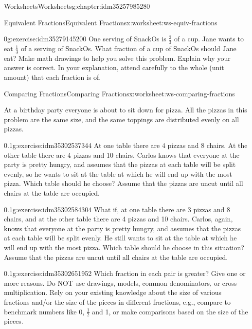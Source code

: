 \documentclass[twoside,11pt,]{book}
\begin{document}
\begin{chapterptx}{Worksheets}{}{Worksheets}{}{}{g:chapter:idm35257985280}
\begin{worksheet-section-numberless}{Equivalent Fractions}{}{Equivalent Fractions}{}{}{x:worksheet:ws-equiv-fractions}
\begin{divisionexercise}{5}{}{0}{g:exercise:idm35279145200}%
One serving of SnackOs is \(\frac{2}{3} \) of a cup. Jane wants to eat \(\frac{1}{3} \) of a serving of SnackOs. What fraction of a cup of SnackOs should Jane eat? Make math drawings to help you solve this problem. Explain why your answer is correct. In your explanation, attend carefully to the whole (unit amount) that each fraction is of.%
\end{divisionexercise}%
\end{worksheet-section-numberless}
\restoregeometry
%
%
\typeout{************************************************}
\typeout{************************************************}
%
\begin{worksheet-section-numberless}{Comparing Fractions}{}{Comparing Fractions}{}{}{x:worksheet:ws-comparing-fractions}
\begin{introduction}{}%
At a birthday party everyone is about to sit down for pizza.  All the pizzas in this problem are the same size, and the same toppings are distributed evenly on all pizzas.%
\end{introduction}%
\begin{divisionexercise}{1}{}{0.1}{g:exercise:idm35302537344}%
At one table there are 4 pizzas and 8 chairs.  At the other table there are 4 pizzas and 10 chairs.  Carlos knows that everyone at the party is pretty hungry, and assumes that the pizzas at each table will be split evenly, so he wants to sit at the table at which he will end up with the most pizza.  Which table should he choose?  Assume that the pizzas are uncut until all chairs at the table are occupied.%
\end{divisionexercise}%
\begin{divisionexercise}{2}{}{0.1}{g:exercise:idm35302584304}%
What if, at one table there are 3 pizzas and 8 chairs, and at the other table there are 4 pizzas and 10 chairs.  Carlos, again, knows that everyone at the party is pretty hungry, and assumes that the pizzas at each table will be split evenly.  He still wants to sit at the table at which he will end up with the most pizza.  Which table should he choose in this situation? Assume that the pizzas are uncut until all chairs at the table are occupied.%
\end{divisionexercise}%
\begin{divisionexercise}{3}{}{0.1}{g:exercise:idm35302651952}%
Which fraction in each pair is greater?  Give one or more reasons.  Do NOT use drawings, models, common denominators, or cross-multiplication.  Rely on your existing knowledge about the size of various fractions and\slash{}or the size of the pieces in different fractions, e.g., compare to benchmark numbers like 0, \(\frac{1}{2} \) and 1, or make comparisons based on the size of the pieces.%

\end{divisionexercise}
\end{worksheet-section-numberless}
\end{chapterptx}
\end{document}
